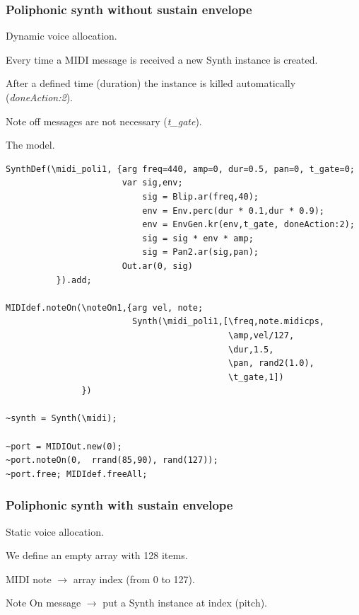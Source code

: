 \subsubsection{Poliphonic synth without sustain envelope}\label{poliphonic-synth-without-sustain-envelope}

Dynamic voice allocation.

Every time a MIDI message is received a new Synth instance is created.

After a defined time (duration) the instance is killed automatically (\textit{doneAction:2}).

Note off messages are not necessary (\textit{t\_gate}).

The model.

\begin{lstlisting}[frame=single, caption=MIDI poliphonic no-sustain instrument model] 
SynthDef(\midi_poli1, {arg freq=440, amp=0, dur=0.5, pan=0, t_gate=0;
                       var sig,env;
                           sig = Blip.ar(freq,40);
                           env = Env.perc(dur * 0.1,dur * 0.9);
                           env = EnvGen.kr(env,t_gate, doneAction:2);
                           sig = sig * env * amp;
                           sig = Pan2.ar(sig,pan);
                       Out.ar(0, sig)
          }).add;

MIDIdef.noteOn(\noteOn1,{arg vel, note;
                         Synth(\midi_poli1,[\freq,note.midicps,
                                            \amp,vel/127,
                                            \dur,1.5,
                                            \pan, rand2(1.0),
                                            \t_gate,1])
               })

~synth = Synth(\midi);

~port = MIDIOut.new(0);
~port.noteOn(0,  rrand(85,90), rand(127));
~port.free; MIDIdef.freeAll;      
\end{lstlisting} 

\subsubsection{Poliphonic synth with sustain envelope}\label{poliphonic-synth-with-sustain-envelope}

Static voice allocation.

We define an empty array with 128 items.

MIDI note \(\rightarrow\) array index (from 0 to 127).

Note On message \(\rightarrow\) put a Synth instance at index (pitch).

